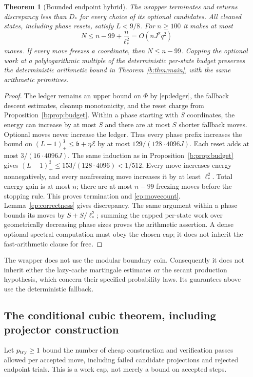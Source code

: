 \documentclass[11pt]{amsart}
\newtheorem{theorem}{Theorem}[section]
\theoremstyle{definition}\newtheorem{definition}[theorem]{Definition}
\theoremstyle{remark}\newtheorem{remark}[theorem]{Remark}
\numberwithin{equation}{section}
\begin{document}
\begin{theorem}[Bounded endpoint hybrid]\label{ep:wrapper}
The wrapper terminates and returns discrepancy less than $D_*$ for
every choice of its optional candidates. All cleaned states, including
phase resets, satisfy $L<9/8$. For $n\ge100$ it makes at most
\begin{equation}\label{ep:movecount}
 N\le n-99+\frac{n}{\ell_*^2}=O(nJ^2q^2)
\end{equation}
moves. If every move freezes a coordinate, then $N\le n-99$.
Capping the optional work at a polylogarithmic multiple of the
deterministic per-state budget preserves the deterministic arithmetic
bound in Theorem~\ref{b:thm:main}, with the same arithmetic primitives.
\end{theorem}
\begin{proof}
The ledger remains an upper bound on $\Phi$ by \eqref{ep:ledger},
the fallback descent estimates, cleanup monotonicity, and the reset
charge from Proposition~\ref{b:prop:budget}. Within a phase starting
with $S$ coordinates, the energy can increase by at most $S$ and there
are at most $S$ shorter fallback moves. Optional moves never increase
the ledger. Thus every phase prefix increases the bound on
$(L-1)_+^3\le\mathfrak b+\eta\mathcal E$ by at most
$129/(128\cdot4096J)$. Each reset adds at most
$3/(16\cdot4096J)$. The same induction as in
Proposition~\ref{b:prop:budget} gives
$(L-1)_+^3\le153/(128\cdot4096)<1/512$.
Every move increases energy nonnegatively, and every nonfreezing move
increases it by at least $\ell_*^2$. Total energy gain is at most $n$;
there are at most $n-99$ freezing moves before the stopping rule.
This proves termination and \eqref{ep:movecount}.
Lemma~\ref{ep:correctness} gives discrepancy. The same argument within
a phase bounds its moves by $S+S/\ell_*^2$; summing the capped
per-state work over geometrically decreasing phase sizes proves the
arithmetic assertion. A dense optional spectral computation must obey
the chosen cap; it does not inherit the fast-arithmetic clause for free.
\end{proof}

The wrapper does not use the modular boundary coin. Consequently it
does not inherit either the lazy-cache martingale estimates or the
secant production hypothesis, which concern their specified probability
laws. Its guarantees above use the deterministic fallback.

\subsection{The conditional cubic theorem, including projector construction}
\label{ep:cubic-section}
Let $p_{\rm try}\ge1$ bound the number of cheap construction and
verification passes allowed per accepted move, including failed
candidate projections and rejected endpoint trials. This is a work
cap, not merely a bound on accepted steps.
\end{document}
